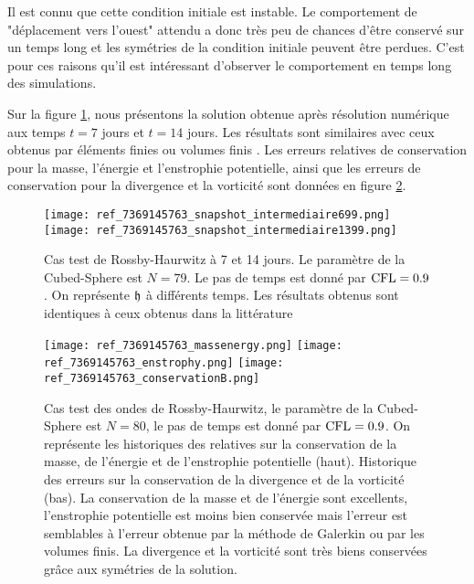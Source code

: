 Il est connu  que cette condition initiale est instable\cite{Thuburn2000}. Le comportement de "déplacement vers l'ouest" attendu a donc très peu de chances d'être conservé sur un temps long et les symétries de la condition initiale peuvent être perdues. C'est pour ces raisons qu'il est intéressant d'observer le comportement en temps long des simulations.

Sur la figure \ref{fig: rossby 714}, nous présentons la solution obtenue après résolution numérique aux temps $t=7$ jours et $t=14$ jours. Les résultats sont similaires avec ceux obtenus par éléments finies ou volumes finis \cite{Chen2008, Galewsky2004}. Les erreurs relatives de conservation pour la masse, l'énergie et l'enstrophie potentielle, ainsi que les erreurs de conservation pour la divergence et la vorticité sont données en figure \ref{fig: rossby conservation}.

\begin{figure}[htbp]
\begin{center}
\texttt{[image: ref\_7369145763\_snapshot\_intermediaire699.png]}
\texttt{[image: ref\_7369145763\_snapshot\_intermediaire1399.png]}
\end{center}
\caption{Cas test de Rossby-Haurwitz à 7 et 14 jours. Le paramètre de la Cubed-Sphere est $N=79$. Le pas de temps est donné par $\text{CFL}=0.9$. On représente $\mathfrak{h}$ à différents temps. Les résultats obtenus sont identiques à ceux obtenus dans la littérature \cite{Ullrich2011, Chen2008}}
\label{fig: rossby 714}
\end{figure}

\begin{figure}[htbp]
\begin{center}
\texttt{[image: ref\_7369145763\_massenergy.png]}
\texttt{[image: ref\_7369145763\_enstrophy.png]}
\texttt{[image: ref\_7369145763\_conservationB.png]}
\end{center}
\caption{Cas test des ondes de Rossby-Haurwitz, le paramètre de la Cubed-Sphere est $N=80$, le pas de temps est donné par $\text{CFL}=0.9$. On représente les historiques des relatives sur la conservation de la masse, de l'énergie et de l'enstrophie potentielle (haut). Historique des erreurs sur la conservation de la divergence et de la vorticité (bas). La conservation de la masse et de l'énergie sont excellents, l'enstrophie potentielle est moins bien conservée mais l'erreur est semblables à l'erreur obtenue par la méthode de Galerkin ou par les volumes finis. La divergence et la vorticité sont très biens conservées grâce aux symétries de la solution.}
\label{fig: rossby conservation}
\end{figure}

